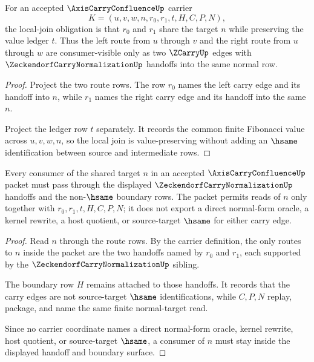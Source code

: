 \begin{theorem}
\label{thm:axis-carry-confluence-local-join-obligation}
For an accepted $\AxisCarryConfluenceUp$ carrier
$$
K=(u,v,w,n,r_0,r_1,t,H,C,P,N),
$$
the local-join obligation is that $r_0$ and $r_1$ share the target $n$ while preserving the value ledger $t$. Thus the left route from $u$ through $v$ and the right route from $u$ through $w$ are consumer-visible only as two $\ZCarryUp$ edges with $\ZeckendorfCarryNormalizationUp$ handoffs into the same normal row.
\end{theorem}
\begin{proof}
Project the two route rows. The row $r_0$ names the left carry edge and its handoff into $n$, while $r_1$ names the right carry edge and its handoff into the same $n$.

Project the ledger row $t$ separately. It records the common finite Fibonacci value across $u,v,w,n$, so the local join is value-preserving without adding an $\hsame$ identification between source and intermediate rows.
\end{proof}

\begin{theorem}
\label{thm:axis-carry-confluence-normal-form-obligation}
Every consumer of the shared target $n$ in an accepted $\AxisCarryConfluenceUp$ packet must pass through the displayed $\ZeckendorfCarryNormalizationUp$ handoffs and the non-$\hsame$ boundary rows. The packet permits reads of $n$ only together with $r_0,r_1,t,H,C,P,N$; it does not export a direct normal-form oracle, a kernel rewrite, a host quotient, or source-target $\hsame$ for either carry edge.
\end{theorem}
\begin{proof}
Read $n$ through the route rows. By the carrier definition, the only routes to $n$ inside the packet are the two handoffs named by $r_0$ and $r_1$, each supported by the $\ZeckendorfCarryNormalizationUp$ sibling.

The boundary row $H$ remains attached to those handoffs. It records that the carry edges are not source-target $\hsame$ identifications, while $C,P,N$ replay, package, and name the same finite normal-target read.

Since no carrier coordinate names a direct normal-form oracle, kernel rewrite, host quotient, or source-target $\hsame$, a consumer of $n$ must stay inside the displayed handoff and boundary surface.
\end{proof}


